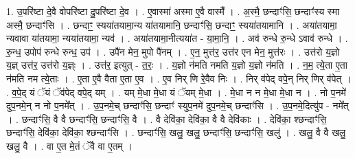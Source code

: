 \documentclass[17pt]{extarticle}
\begin{document}
1. उ॒परि॑ष्टा दे॒वै वोपरि॑ष्टा दु॒परि॑ष्टा दे॒व । . ए॒वास्मा॑ अस्मा ए॒वै वास्मै᳚ । . अ॒स्मै॒ छन्दाꣳ॑सि॒ छन्दाꣳ॑स्य स्मा अस्मै॒ छन्दाꣳ॑सि । . छन्दाꣳ॒॒ स्यया॑तयामा॒न्य या॑तयामानि॒ छन्दाꣳ॑सि॒ छन्दाꣳ॒॒ स्यया॑तयामानि । . अया॑तयामा॒ न्यवावा या॑तयामा॒ न्यया॑तयामा॒ न्यव॑ । . अया॑तयामा॒नीत्यया॑त - या॒मा॒नि॒ । . अव॑ रुन्धे रु॒न्धे ऽवाव॑ रुन्धे । . रु॒न्ध॒ उपोप॑ रुन्धे रुन्ध॒ उप॑ । . उपै॑न मेन॒ मुपो पै॑नम् । . ए॒न॒ मुत्त॑र॒ उत्त॑र एन मेन॒ मुत्त॑रः । . उत्त॑रो य॒ज्ञो य॒ज्ञ् उत्त॑र॒ उत्त॑रो य॒ज्ञ्ः । . उत्त॑र॒ इत्युत् - त॒रः॒ । . य॒ज्ञो न॑मति नमति य॒ज्ञो य॒ज्ञो न॑मति । . न॒म॒ त्ये॒ता ए॒ता न॑मति नम त्ये॒ताः । . ए॒ता ए॒वै वैता ए॒ता ए॒व । . ए॒व निर् णि रे॒वैव निः । . निर् व॑पेद् वपे॒न् निर् णिर् व॑पेत् । . व॒पे॒द् यं ॅयं ॅव॑पेद् वपे॒द् यम् । . यम् मे॒धा मे॒धा यं ॅयम् मे॒धा । . मे॒धा न न मे॒धा मे॒धा न । . नो प॒नमे॑ दुप॒नमे॒न् न नो प॒नमे᳚त् । . उ॒प॒नमे॒च् छन्दाꣳ॑सि॒ छन्दाꣳ॑ स्युप॒नमे॑ दुप॒नमे॒च् छन्दाꣳ॑सि । . उ॒प॒नमे॒दित्यु॑प - नमे᳚त् । . छन्दाꣳ॑सि॒ वै वै छन्दाꣳ॑सि॒ छन्दाꣳ॑सि॒ वै । . वै देवि॑का॒ देवि॑का॒ वै वै देवि॑काः । . देवि॑का॒ श्छन्दाꣳ॑सि॒ छन्दाꣳ॑सि॒ देवि॑का॒ देवि॑का॒ श्छन्दाꣳ॑सि । . छन्दाꣳ॑सि॒ खलु॒ खलु॒ छन्दाꣳ॑सि॒ छन्दाꣳ॑सि॒ खलु॑ । . खलु॒ वै वै खलु॒ खलु॒ वै । . वा ए॒त मे॒तं ॅवै वा ए॒तम् । \newline
\end{document}
